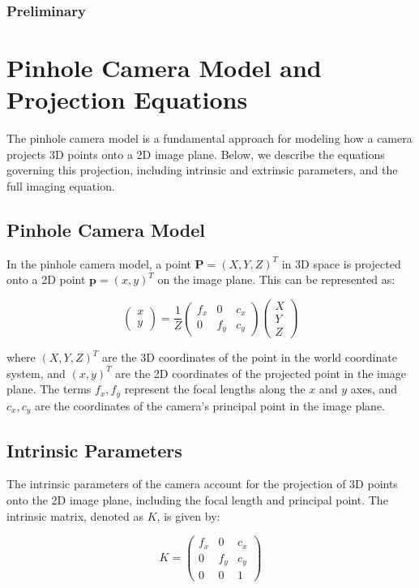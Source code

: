 \subsubsection{Preliminary}
\section{Pinhole Camera Model and Projection Equations}

The pinhole camera model is a fundamental approach for modeling how a camera projects 3D points onto a 2D image plane. Below, we describe the equations governing this projection, including intrinsic and extrinsic parameters, and the full imaging equation.

\subsection{Pinhole Camera Model}
In the pinhole camera model, a point $\mathbf{P} = (X, Y, Z)^T$ in 3D space is projected onto a 2D point $\mathbf{p} = (x, y)^T$ on the image plane. This can be represented as:

\[
\begin{pmatrix}
	x \\
	y
\end{pmatrix}
=
\frac{1}{Z}
\begin{pmatrix}
	f_x & 0 & c_x \\
	0 & f_y & c_y
\end{pmatrix}
\begin{pmatrix}
	X \\
	Y \\
	Z
\end{pmatrix}
\]

where $(X, Y, Z)^T$ are the 3D coordinates of the point in the world coordinate system, and $(x, y)^T$ are the 2D coordinates of the projected point in the image plane. The terms $f_x, f_y$ represent the focal lengths along the $x$ and $y$ axes, and $c_x, c_y$ are the coordinates of the camera's principal point in the image plane.

\subsection{Intrinsic Parameters}
The intrinsic parameters of the camera account for the projection of 3D points onto the 2D image plane, including the focal length and principal point. The intrinsic matrix, denoted as $K$, is given by:

\[
K = 
\begin{pmatrix}
	f_x & 0 & c_x \\
	0 & f_y & c_y \\
	0 & 0 & 1
\end{pmatrix}
\]

